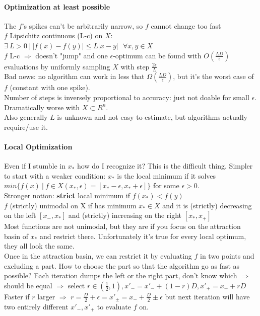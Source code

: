\documentclass[10pt]{report}
\begin{document}
\paragraph{Optimization at least possible} The $f$'s spikes can't be arbitrarily narrow, so $f$ cannot change too fast\\
$f$ Lipsichitz continuous (L-c) on $X$: $\exists\: L > 0\:|\:|f(x) - f(y)| \leq L|x - y|\:\:\:\forall x,y\in X$\\
$f$ L-c $\Rightarrow$ doesn't "jump" and one $\epsilon$-optimum can be found with $O(\frac{LD}{\epsilon})$ evaluations by uniformly sampling $X$ with step $\frac{2\epsilon}{L}$\\
Bad news: no algorithm can work in less that $\Omega(\frac{LD}{\epsilon})$, but it's the worst case of $f$ (constant with one spike).\\
Number of steps is inversely proportional to accuracy: just not doable for small $\epsilon$. Dramatically worse with $X\subset R^n$.\\
Also generally $L$ is unknown and not easy to estimate, but algorithms actually require/use it.
\paragraph{Local Optimization} Even if I stumble in $x_*$ how do I recognize it? This is the difficult thing. Simpler to start with a weaker condition: $x_*$ is the local minimum if it solves $min\{f(x)\:|\:f\in X(x_*, \epsilon) = [x_* - \epsilon, x_* + \epsilon]\}$ for some $\epsilon > 0$.\\
Stronger notion: \textbf{strict} local minimum if $f(x_*) < f(y)$\\
$f$ (strictly) unimodal on X if has minimum $x_* \in X$ and it is (strictly) decreasing on the left $[x_-, x_*]$ and (strictly) increasing on the right $[x_*, x_+]$\\
Most functions are not unimodal, but they are if you focus on the attraction basin of $x_*$ and restrict there. Unfortunately it's true for every local optimum, they all look the same.\\
Once in the attraction basin, we can restrict it by evaluating $f$ in two points and excluding a part. %
How to choose the part so that the algorithm go as fast as possible? Each iteration dumps the left or the right part, don't know which $\Rightarrow$ should be equal $\Rightarrow$ select $r \in (\frac{1}{2}, 1), x'_- = x'_- + (1 - r)D, x'_+ = x_- + rD$\\
Faster if $r$ larger $\Rightarrow$ $r = \frac{D}{2} + \epsilon = x'_\pm = x_- + \frac{D}{2} \pm \epsilon$ but next iteration will have two entirely different $x'_-, x'_+$ to evaluate $f$ on.
\end{document}
